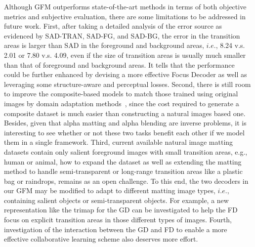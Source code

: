 \documentclass[twocolumn]{svjour3}
\begin{document}
Although GFM outperforms state-of-the-art methods in terms of both objective metrics and subjective evaluation, there are some limitations to be addressed in future work. First, after taking a detailed analysis of the error source as evidenced by SAD-TRAN, SAD-FG, and SAD-BG, the error in the transition areas is larger than SAD in the foreground and background areas, $i.e.$, 8.24 v.s. 2.01 or 7.80 v.s. 4.09, even if the size of transition areas is usually much smaller than that of foreground and background areas. It tells that the performance could be further enhanced by devising a more effective Focus Decoder as well as leveraging some structure-aware and perceptual losses. Second, there is still room to improve the composite-based models to match those trained using original images by domain adaptation methods~\citep{zhang2019category}, since the cost required to generate a composite dataset is much easier than constructing a natural images based one. Besides, given that alpha matting and alpha blending are inverse problems, it is interesting to see whether or not these two tasks benefit each other if we model them in a single framework. Third, current available natural image matting datasets contain only salient foreground images with small transition areas, e.g., human or animal, how to expand the dataset as well as extending the matting method to handle semi-transparent or long-range transition areas like a plastic bag or raindrops, remains as an open challenge. To this end, the two decoders in our GFM may be modified to adapt to different matting image types, $i.e.$, containing salient objects or semi-transparent objects. For example, a new representation like the trimap for the GD can be investigated to help the FD focus on explicit transition areas in those different types of images. Fourth, investigation of the interaction between the GD and FD to enable a more effective collaborative learning scheme also deserves more effort.



\end{document}
